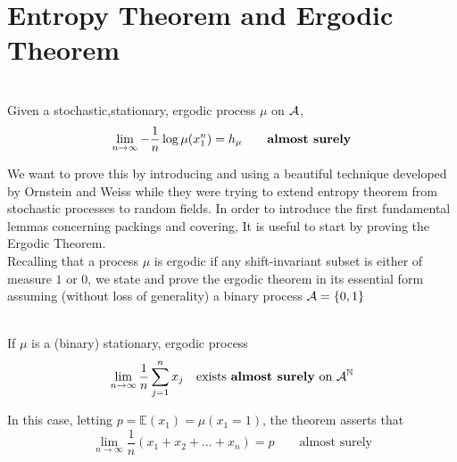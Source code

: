 \section{Entropy Theorem and Ergodic Theorem}

\begin{theorem}
\label{th:entropy_theorem}
\hfill \\
    Given a stochastic,stationary, ergodic process $\mu$ on $\mathcal{A}$,
    \begin{equation}
        \lim_{n \rightarrow \infty} -\frac{1}{n} \log \mu(x_1^n) = h_\mu \qquad \text{\textbf{almost surely}}
    \end{equation}
\end{theorem}
We want to prove this by introducing and using a beautiful technique
developed by Ornstein and Weiss while they were trying to extend entropy theorem
from stochastic processes to random fields. In order to introduce the first fundamental lemmas concerning packings and covering, It is useful to start by proving the Ergodic Theorem.
\\Recalling that a process $\mu$ is ergodic if any shift-invariant subset is either of measure $1$ or $0$, we state and prove the ergodic theorem in its essential form assuming (without loss of generality) a binary process $\mathcal{A}= \{0,1 \}$
\begin{theorem}
\hfill \\
    If $\mu$ is a (binary) stationary, ergodic process
    \begin{equation*}
        \lim_{n \rightarrow \infty} \frac{1}{n} \sum_{j=1}^n x_j \quad \text{exists \textbf{almost surely} on } \mathcal{A}^{\mathbb{N}}
    \end{equation*}
\end{theorem}
In this case, letting $p = \mathbb{E}(x_1) = \mu(x_1=1)$, the theorem asserts that 
\begin{equation*}
    \lim_{n \rightarrow \infty} \frac{1}{n} (x_1 + x_2 +\dots+ x_n) = p \qquad \text{almost surely}
\end{equation*}
